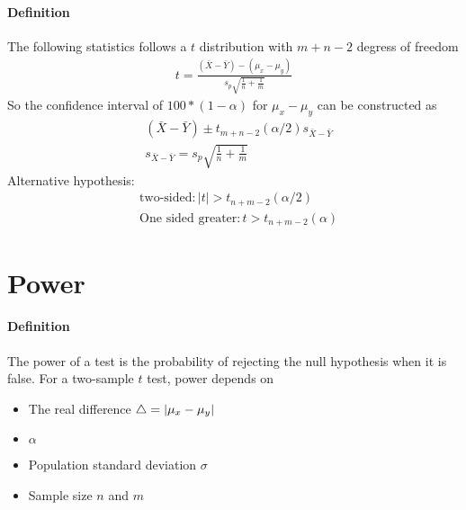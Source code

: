 \paragraph{Definition}
The following statistics follows a $t$ distribution with $m+n-2$ degress of freedom 
    \begin{align*}
        t = \frac{(\bar{X}-\bar{Y}) - (\mu_x - \mu_y)}{s_p \sqrt{\frac{1}{n} + \frac{1}{m}}}
    \end{align*}
So the confidence interval of $100 * (1-\alpha)$ for $\mu_x - \mu_y$ can be constructed as 
    \begin{align*}
        & (\bar{X} - \bar{Y}) \pm t_{m+n-2} (\alpha / 2)s_{\bar{X}- \bar{Y}}\\
        & s_{\bar{X}- \bar{Y}} = s_p \sqrt{\frac{1}{n} + \frac{1}{m}}
    \end{align*}
Alternative hypothesis: 
    \begin{align*}
        & \text{two-sided}: |t| > t_{n+m-2}(\alpha / 2) \\
        & \text{One sided greater}: t > t_{n+m-2}(\alpha)
    \end{align*}
    
    
\section{Power} 

\paragraph{Definition} The power of a test is the probability of rejecting the null hypothesis when it is false. For a two-sample $t$ test, power depends on 
    \begin{itemize}
        \item The real difference $\triangle = \left| \mu_x - \mu_y \right|$
        \item $\alpha$
        \item Population standard deviation $\sigma$
        \item Sample size $n$ and $m$
    \end{itemize}
    
    

